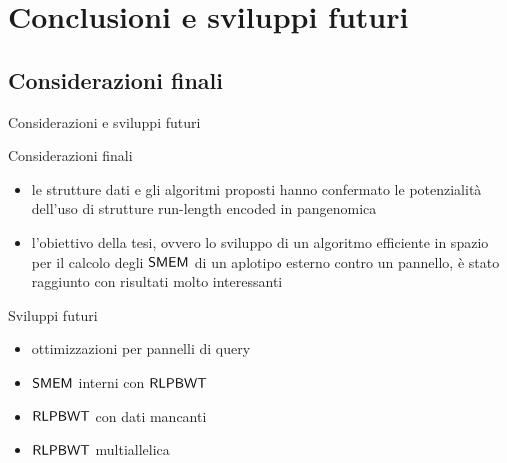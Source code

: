 \documentclass[]{beamer}
\def\KSMEM{\mbox{\rm {\sf K-SMEM}}}
\def\RLPBWT{\mbox{\rm {\sf RLPBWT}}}
\def\SMEM{\mbox{\rm {\sf SMEM}}}
\begin{document}
\section{Conclusioni e sviluppi futuri}
\subsection{Considerazioni finali}
\begin{frame}{Considerazioni e sviluppi futuri}
  \begin{block}{Considerazioni finali}
    \small
    \begin{itemize}
      \item le strutture dati e gli algoritmi proposti hanno
      confermato le potenzialità dell'uso di strutture run-length encoded in
      pangenomica
      \item l'obiettivo della tesi, ovvero lo sviluppo di un algoritmo
      efficiente in spazio per il calcolo degli $\SMEM$ di un aplotipo esterno
      contro un pannello, è stato raggiunto con risultati molto interessanti
    \end{itemize}
  \end{block}
  \begin{block}{Sviluppi futuri}
    \small
    \begin{multicols}{2}
      \begin{itemize}
        \item ottimizzazioni per pannelli di query
        \item $\SMEM$ interni con $\RLPBWT$
        \item $\RLPBWT$ con dati mancanti
        \item $\RLPBWT$ multiallelica
      \end{itemize}
    \end{multicols}
  \end{block}
\end{frame}
\end{document}
